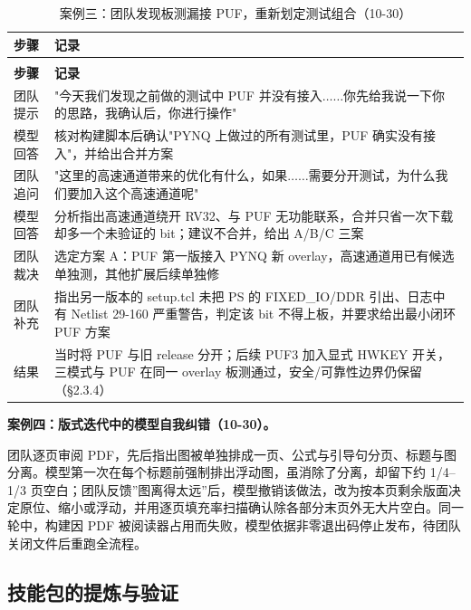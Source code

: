 {\small
\setlength{\tabcolsep}{4pt}
\renewcommand{\thetable}{2-23}
\begin{longtable}{@{}>{\raggedright\arraybackslash}p{}>{\raggedright\arraybackslash}p{}@{}}
\caption{案例三：团队发现板测漏接 PUF，重新划定测试组合（10-30）}\label{tab:2-23}\\
\toprule
\textbf{步骤} & \textbf{记录} \\
\midrule
\endfirsthead
\multicolumn{2}{@{}l}{\footnotesize 续表 2-23}\\
\toprule
\textbf{步骤} & \textbf{记录} \\
\midrule
\endhead
团队提示 & "今天我们发现之前做的测试中 PUF 并没有接入$\ldots$$\ldots$你先给我说一下你的思路，我确认后，你进行操作" \\
模型回答 & 核对构建脚本后确认"PYNQ 上做过的所有测试里，PUF 确实没有接入"，并给出合并方案 \\
团队追问 & "这里的高速通道带来的优化有什么，如果$\ldots$$\ldots$需要分开测试，为什么我们要加入这个高速通道呢" \\
模型回答 & 分析指出高速通道绕开 RV32、与 PUF 无功能联系，合并只省一次下载却多一个未验证的 bit；建议不合并，给出 A/B/C 三案 \\
团队裁决 & 选定方案 A：PUF 第一版接入 PYNQ 新 overlay，高速通道用已有候选单独测，其他扩展后续单独修 \\
团队补充 & 指出另一版本的 setup.tcl 未把 PS 的 FIXED\_\allowbreak{}IO/DDR 引出、日志中有 Netlist 29-160 严重警告，判定该 bit 不得上板，并要求给出最小闭环 PUF 方案 \\
结果 & 当时将 PUF 与旧 release 分开；后续 PUF3 加入显式 HWKEY 开关，三模式与 PUF 在同一 overlay 板测通过，安全/可靠性边界仍保留（§2.3.4） \\
\bottomrule
\end{longtable}
}

\textbf{案例四：版式迭代中的模型自我纠错（10-30）。}

团队逐页审阅 PDF，先后指出图被单独排成一页、公式与引导句分页、标题与图分离。模型第一次在每个标题前强制排出浮动图，虽消除了分离，却留下约 1/4--1/3 页空白；团队反馈''图离得太远''后，模型撤销该做法，改为按本页剩余版面决定原位、缩小或浮动，并用逐页填充率扫描确认除各部分末页外无大片空白。同一轮中，构建因 PDF 被阅读器占用而失败，模型依据非零退出码停止发布，待团队关闭文件后重跑全流程。

\Needspace{85pt}

\subsection{技能包的提炼与验证}

